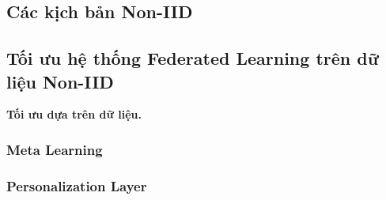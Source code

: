 \subsection{Các kịch bản Non-IID}



\subsection{Tối ưu hệ thống Federated Learning trên dữ liệu Non-IID}

\textbf{Tối ưu dựa trên dữ liệu.}

\subsubsection{Meta Learning}

\subsubsection{Personalization Layer}
